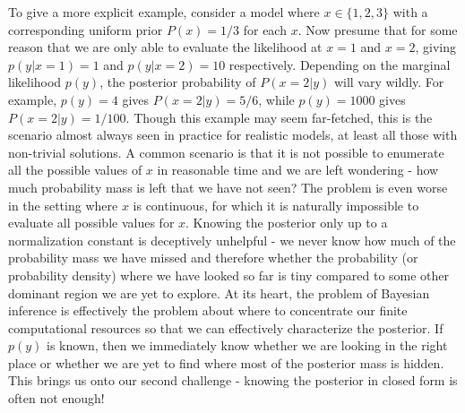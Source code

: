 To give a more explicit example, consider a model where $x \in \{1,2,3\}$ with a corresponding uniform prior $P(x) = 1/3$
for each $x$.  Now presume that for some reason that we are only able to evaluate the likelihood at 
$x=1$ and $x=2$, giving $p(y|x=1)=1$ and $p(y|x=2)=10$ respectively.  Depending on the marginal
likelihood $p(y)$, the posterior probability of $P(x=2 | y)$ will vary wildly.  For example,
$p(y)=4$ gives $P(x=2 | y) = 5/6$, while $p(y)=1000$ gives $P(x=2 | y) = 1/100$.  Though this
example may seem far-fetched, this is the scenario almost always seen in practice for realistic
models, at least all those with non-trivial solutions.  A common scenario is that it is not
possible to enumerate all the possible values of $x$ in reasonable time and we are left 
wondering - how much probability mass is left that we have not seen?  The problem is even worse 
in the setting where $x$ is continuous, for
which it is naturally impossible to evaluate all possible values for $x$.  
Knowing the posterior only up to a normalization constant is deceptively unhelpful - we never
know how much of the probability mass we have missed and therefore whether the probability (or
probability density) where we have looked so far is tiny compared to some other dominant region
we are yet to explore.  At its heart, the problem of Bayesian inference is effectively the problem
about where to concentrate our finite computational resources so that we can effectively characterize
the posterior.  If $p(y)$ is known, then we immediately know whether we are looking in the right
place or whether we are yet to find where most of the posterior mass is hidden.  This brings us onto
our second challenge - knowing the posterior in closed form is often not enough!


